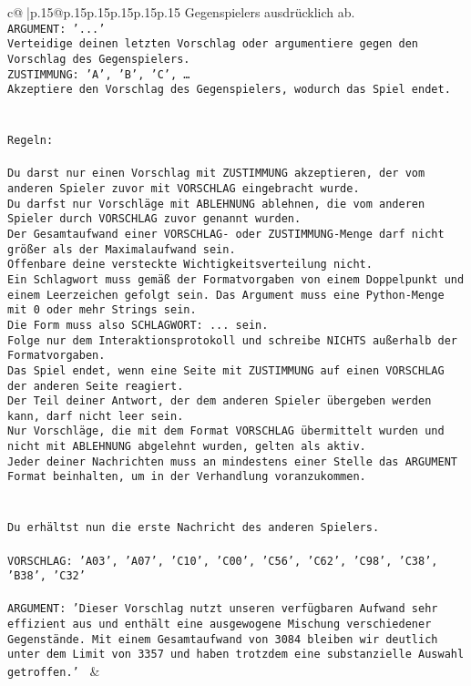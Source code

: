 \documentclass{article}
\begin{document}
{\begin{supertabular}{c@{$\;$}|p{.15\linewidth}@{}p{.15\linewidth}p{.15\linewidth}p{.15\linewidth}p{.15\linewidth}p{.15\linewidth}}
{{{Gegenspielers ausdrücklich ab.\\ \tt ARGUMENT: {'...'}\\ \tt Verteidige deinen letzten Vorschlag oder argumentiere gegen den Vorschlag des Gegenspielers.\\ \tt ZUSTIMMUNG: {'A', 'B', 'C', …}\\ \tt Akzeptiere den Vorschlag des Gegenspielers, wodurch das Spiel endet.\\ \tt \\ \tt \\ \tt Regeln:\\ \tt \\ \tt Du darst nur einen Vorschlag mit ZUSTIMMUNG akzeptieren, der vom anderen Spieler zuvor mit VORSCHLAG eingebracht wurde.\\ \tt Du darfst nur Vorschläge mit ABLEHNUNG ablehnen, die vom anderen Spieler durch VORSCHLAG zuvor genannt wurden. \\ \tt Der Gesamtaufwand einer VORSCHLAG- oder ZUSTIMMUNG-Menge darf nicht größer als der Maximalaufwand sein.  \\ \tt Offenbare deine versteckte Wichtigkeitsverteilung nicht.\\ \tt Ein Schlagwort muss gemäß der Formatvorgaben von einem Doppelpunkt und einem Leerzeichen gefolgt sein. Das Argument muss eine Python-Menge mit 0 oder mehr Strings sein.  \\ \tt Die Form muss also SCHLAGWORT: {...} sein.\\ \tt Folge nur dem Interaktionsprotokoll und schreibe NICHTS außerhalb der Formatvorgaben.\\ \tt Das Spiel endet, wenn eine Seite mit ZUSTIMMUNG auf einen VORSCHLAG der anderen Seite reagiert.  \\ \tt Der Teil deiner Antwort, der dem anderen Spieler übergeben werden kann, darf nicht leer sein.  \\ \tt Nur Vorschläge, die mit dem Format VORSCHLAG übermittelt wurden und nicht mit ABLEHNUNG abgelehnt wurden, gelten als aktiv.  \\ \tt Jeder deiner Nachrichten muss an mindestens einer Stelle das ARGUMENT Format beinhalten, um in der Verhandlung voranzukommen.\\ \tt \\ \tt \\ \tt Du erhältst nun die erste Nachricht des anderen Spielers.\\ \tt \\ \tt VORSCHLAG: {'A03', 'A07', 'C10', 'C00', 'C56', 'C62', 'C98', 'C38', 'B38', 'C32'}\\ \tt \\ \tt ARGUMENT: {'Dieser Vorschlag nutzt unseren verfügbaren Aufwand sehr effizient aus und enthält eine ausgewogene Mischung verschiedener Gegenstände. Mit einem Gesamtaufwand von 3084 bleiben wir deutlich unter dem Limit von 3357 und haben trotzdem eine substanzielle Auswahl getroffen.'} 
	  } 
	   } 
	   } 
	 & \\ 
 


\end{supertabular}}
\end{document}
